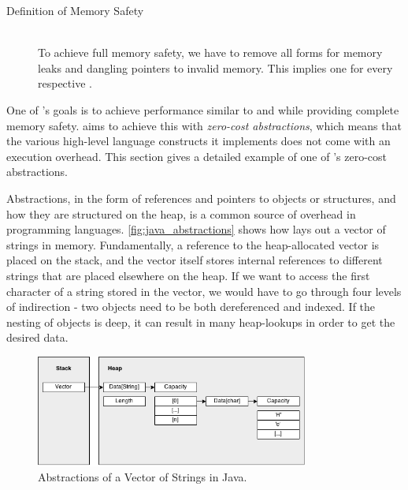 \begin{description}
  \item [Definition of Memory Safety] \hfill \\
To achieve full memory safety, we have to remove all forms for memory leaks and dangling pointers to invalid memory.
This implies one  for every respective .
\end{description}


One of {\rust}'s goals is to achieve performance similar to {\C} and {\Cpp} while providing complete memory safety.
{\rust} aims to achieve this with \emph{zero-cost abstractions}, which means that the various high-level language constructs it implements does not come with an execution overhead.
This section gives a detailed example of one of {\rust}'s zero-cost abstractions.

Abstractions, in the form of references and pointers to objects or structures, and how they are
structured on the heap, is a common source of overhead in programming languages.
\autoref{fig:java_abstractions} shows how {\Java} lays out a vector of
strings in memory.
Fundamentally, a reference to the heap-allocated vector is placed on the stack, and the vector itself stores internal references to different strings that are placed elsewhere on the heap.
If we want to access the first character of a string stored in the vector, we would have to go through four levels of indirection - two objects need to be both dereferenced and indexed.
If the nesting of objects is deep, it can result in many heap-lookups in order to get the desired data.

\begin{figure}[tb]
  \begin{center}
    \includegraphics[width=0.8\textwidth]{figures/java_abstractions}
  \end{center}
  \caption{Abstractions of a Vector of Strings in Java.}
  \label{fig:java_abstractions}
\end{figure}

